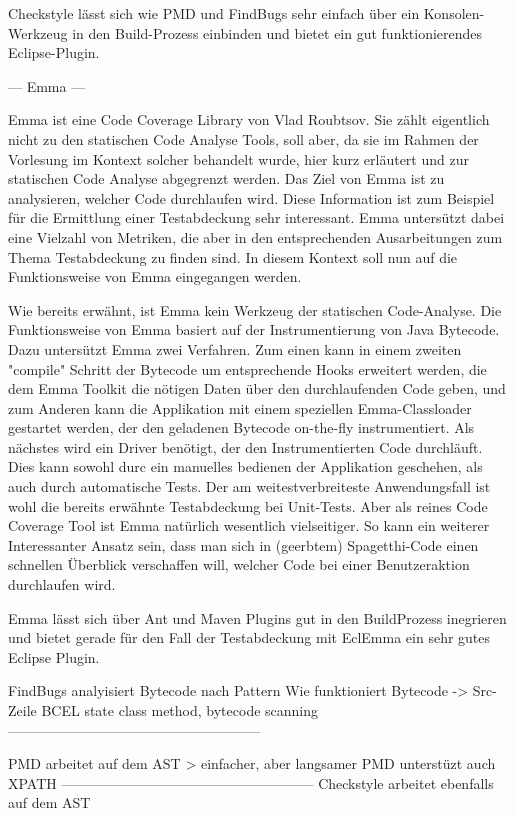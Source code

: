 Checkstyle lässt sich wie PMD und FindBugs sehr einfach über ein Konsolen-Werkzeug in den Build-Prozess einbinden und bietet ein gut funktionierendes Eclipse-Plugin.


--- Emma ---

Emma ist eine Code Coverage Library von Vlad Roubtsov. Sie zählt eigentlich nicht zu den statischen Code Analyse Tools, soll aber, da sie im Rahmen der Vorlesung im Kontext solcher behandelt wurde, hier kurz erläutert und zur statischen Code Analyse abgegrenzt werden. 
Das Ziel von Emma ist zu analysieren, welcher Code durchlaufen wird. Diese Information ist zum Beispiel für die Ermittlung einer Testabdeckung sehr interessant. Emma untersützt dabei eine Vielzahl von Metriken, die aber in den entsprechenden Ausarbeitungen zum Thema Testabdeckung zu finden sind. In diesem Kontext soll nun auf die Funktionsweise von Emma eingegangen werden.

Wie bereits erwähnt, ist Emma kein Werkzeug der statischen Code-Analyse. Die Funktionsweise von Emma basiert auf der Instrumentierung von Java Bytecode. Dazu untersützt Emma zwei Verfahren. Zum einen kann in einem zweiten "compile" Schritt der Bytecode um entsprechende Hooks erweitert werden, die dem Emma Toolkit die nötigen Daten über den durchlaufenden Code geben, und zum Anderen kann die Applikation mit einem speziellen Emma-Classloader gestartet werden, der den geladenen Bytecode on-the-fly instrumentiert. Als nächstes wird ein Driver benötigt, der den Instrumentierten Code durchläuft. Dies kann sowohl durc ein manuelles bedienen der Applikation geschehen, als auch durch automatische Tests. Der am weitestverbreiteste Anwendungsfall ist wohl die bereits erwähnte Testabdeckung bei Unit-Tests. Aber als reines Code Coverage Tool ist Emma natürlich wesentlich vielseitiger. So kann ein weiterer Interessanter Ansatz sein, dass man sich in (geerbtem) Spagetthi-Code einen schnellen Überblick verschaffen will, welcher Code bei einer Benutzeraktion durchlaufen wird.

Emma lässt sich über Ant und Maven Plugins gut in den BuildProzess inegrieren und bietet gerade für den Fall der Testabdeckung mit EclEmma ein sehr gutes Eclipse Plugin.


FindBugs analyisiert Bytecode nach Pattern
Wie funktioniert Bytecode -> Src-Zeile
BCEL
state class method, bytecode scanning
------------------------------------------------------

PMD arbeitet auf dem AST > einfacher, aber langsamer
PMD unterstüzt auch XPATH
------------------------------------------------------
Checkstyle arbeitet ebenfalls auf dem AST



